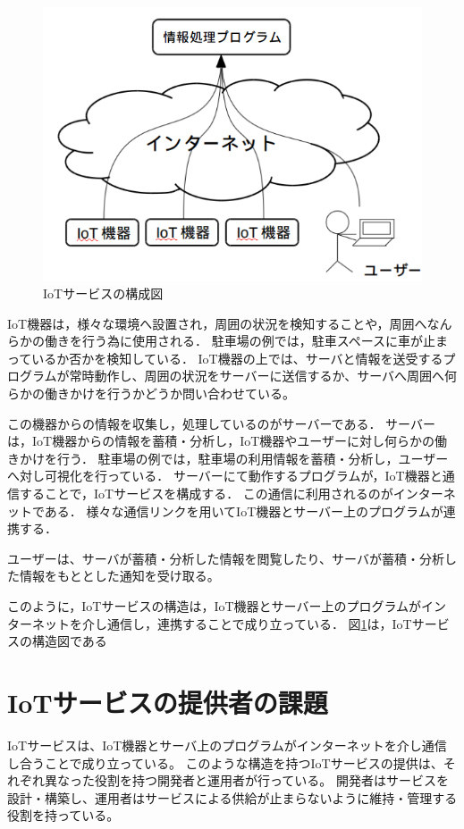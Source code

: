 \begin{figure}[htbp]
\includegraphics[width=14cm]{images/IoTservice.png}
\caption{IoTサービスの構成図}
\label{fig:IoTservice}
\end{figure}

IoT機器は，様々な環境へ設置され，周囲の状況を検知することや，周囲へなんらかの働きを行う為に使用される．
駐車場の例では，駐車スペースに車が止まっているか否かを検知している．
IoT機器の上では、サーバと情報を送受するプログラムが常時動作し、周囲の状況をサーバーに送信するか、サーバへ周囲へ何らかの働きかけを行うかどうか問い合わせている。
\medskip

この機器からの情報を収集し，処理しているのがサーバーである．
サーバーは，IoT機器からの情報を蓄積・分析し，IoT機器やユーザーに対し何らかの働きかけを行う．
駐車場の例では，駐車場の利用情報を蓄積・分析し，ユーザーへ対し可視化を行っている．
サーバーにて動作するプログラムが，IoT機器と通信することで，IoTサービスを構成する．
この通信に利用されるのがインターネットである．
様々な通信リンクを用いてIoT機器とサーバー上のプログラムが連携する．
\medskip


ユーザーは、サーバが蓄積・分析した情報を閲覧したり、サーバが蓄積・分析した情報をもととした通知を受け取る。

このように，IoTサービスの構造は，IoT機器とサーバー上のプログラムがインターネットを介し通信し，連携することで成り立っている．
図\ref{fig:IoTservice}は，IoTサービスの構造図である



\section{IoTサービスの提供者の課題}
IoTサービスは、IoT機器とサーバ上のプログラムがインターネットを介し通信し合うことで成り立っている。
このような構造を持つIoTサービスの提供は、それぞれ異なった役割を持つ開発者と運用者が行っている。
開発者はサービスを設計・構築し、運用者はサービスによる供給が止まらないように維持・管理する役割を持っている。

